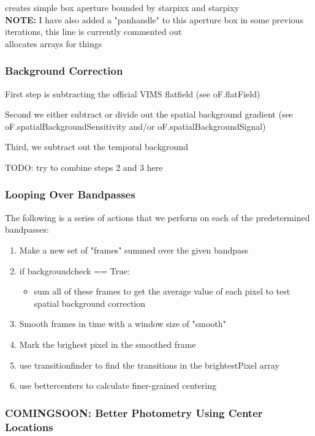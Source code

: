 \documentclass[12pt]{article}
\begin{document}
creates simple box aperture bounded by starpixx and starpixy\\
{\bf NOTE:} I have also added a "panhandle" to this aperture box in some previous
iterations, this line is currently commented out\\

allocates arrays for things\\

\subsubsection{Background Correction}

First step is subtracting the official VIMS flatfield (see oF.flatField)

Second we either subtract or divide out the spatial background gradient
(see oF.spatialBackgroundSensitivity and/or oF.spatialBackgroundSignal)

Third, we subtract out the temporal background

TODO: try to combine steps 2 and 3 here

\subsubsection{Looping Over Bandpasses}

The following is a series of actions that we perform on each of the
predetermined bandpasses:

\begin{enumerate}
\item Make a new set of "frames" summed over the given bandpass
\item if backgroundcheck == True:
   \begin{itemize}
   \item sum all of these frames to get the average value of each pixel to test
      spatial background correction
   \end{itemize}
\item Smooth frames in time with a window size of "smooth"
\item Mark the brighest pixel in the smoothed frame
\item use transitionfinder to find the transitions in the brightestPixel array
\item use bettercenters to calculate finer-grained centering
\end{enumerate}

\subsubsection{COMINGSOON: Better Photometry Using Center Locations}
\end{document}
